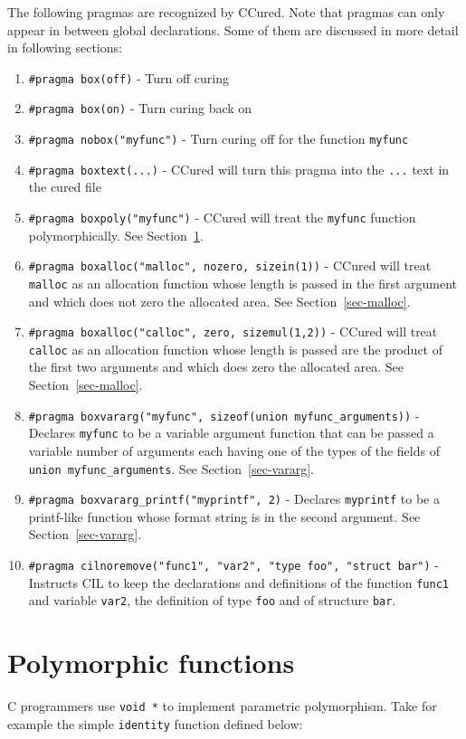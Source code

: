 \documentclass{book}
\def\t#1{{\tt #1}}
\def\secref#1{Section~\ref{sec-#1}}
\begin{document}
 The following pragmas are recognized by CCured. Note that pragmas can only
appear in between global declarations. Some of them are discussed in more
detail in following sections:
\begin{enumerate}
\item \t{#pragma box(off)} - Turn off curing
\item \t{#pragma box(on)} - Turn curing back on
\item \t{#pragma nobox("myfunc")} - Turn curing off for the function
\t{myfunc} 
\item \t{#pragma boxtext(...)} - CCured will turn this pragma into the \t{...}
text in the cured file
\item \t{#pragma boxpoly("myfunc")} - CCured will treat the \t{myfunc}
function polymorphically. See \secref{poly}.
\item \t{#pragma boxalloc("malloc", nozero, sizein(1))} - CCured will treat
\t{malloc} as an allocation function whose length is passed in the first
argument and which does not zero the allocated area.  See \secref{malloc}.
\item \t{#pragma boxalloc("calloc", zero, sizemul(1,2))} - CCured will treat
\t{calloc} as an allocation function whose length is passed are the product of
the first two arguments and which does zero the allocated area.   See
\secref{malloc}.
\item \t{#pragma boxvararg("myfunc", sizeof(union myfunc\_arguments))} -
Declares \t{myfunc} to be a variable argument function that can be passed a
variable number of arguments each having one of the types of the fields of
\t{union myfunc\_arguments}. See \secref{vararg}.
\item \t{#pragma boxvararg\_printf("myprintf", 2)} - Declares \t{myprintf} to
be a printf-like function whose format string is in the second argument.
 See \secref{vararg}.
\item \t{#pragma cilnoremove("func1", "var2", "type foo", "struct bar")} -
Instructs CIL to keep the declarations and definitions of the function
\t{func1} and variable \t{var2}, the definition of type \t{foo} and of
structure \t{bar}.
\end{enumerate}

 
  \section{Polymorphic functions}\label{sec-poly}

 C programmers use \t{void *} to implement parametric polymorphism. Take for
example the simple \t{identity} function defined below:
\end{document}
